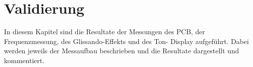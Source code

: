 \clearpage
\section{Validierung}\label{sec:Validierung}
In diesem Kapitel sind die Resultate der Messungen des PCB, der Frequenzmessung, des Glissando-Effekts und des Ton- Display aufgeführt. Dabei werden jeweils der Messaufbau beschrieben und die Resultate dargestellt und kommentiert. 
